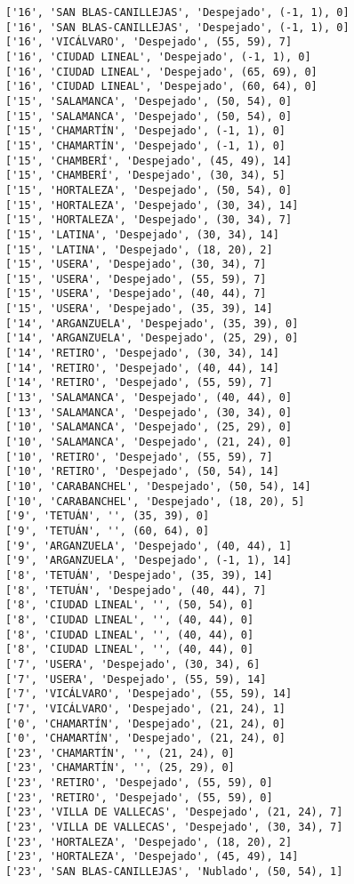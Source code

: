 \documentclass[11pt]{article}
\begin{document}
\begin{Verbatim}[commandchars=\\\{\}]
['16', 'SAN BLAS-CANILLEJAS', 'Despejado', (-1, 1), 0]
['16', 'SAN BLAS-CANILLEJAS', 'Despejado', (-1, 1), 0]
['16', 'VICÁLVARO', 'Despejado', (55, 59), 7]
['16', 'CIUDAD LINEAL', 'Despejado', (-1, 1), 0]
['16', 'CIUDAD LINEAL', 'Despejado', (65, 69), 0]
['16', 'CIUDAD LINEAL', 'Despejado', (60, 64), 0]
['15', 'SALAMANCA', 'Despejado', (50, 54), 0]
['15', 'SALAMANCA', 'Despejado', (50, 54), 0]
['15', 'CHAMARTÍN', 'Despejado', (-1, 1), 0]
['15', 'CHAMARTÍN', 'Despejado', (-1, 1), 0]
['15', 'CHAMBERÍ', 'Despejado', (45, 49), 14]
['15', 'CHAMBERÍ', 'Despejado', (30, 34), 5]
['15', 'HORTALEZA', 'Despejado', (50, 54), 0]
['15', 'HORTALEZA', 'Despejado', (30, 34), 14]
['15', 'HORTALEZA', 'Despejado', (30, 34), 7]
['15', 'LATINA', 'Despejado', (30, 34), 14]
['15', 'LATINA', 'Despejado', (18, 20), 2]
['15', 'USERA', 'Despejado', (30, 34), 7]
['15', 'USERA', 'Despejado', (55, 59), 7]
['15', 'USERA', 'Despejado', (40, 44), 7]
['15', 'USERA', 'Despejado', (35, 39), 14]
['14', 'ARGANZUELA', 'Despejado', (35, 39), 0]
['14', 'ARGANZUELA', 'Despejado', (25, 29), 0]
['14', 'RETIRO', 'Despejado', (30, 34), 14]
['14', 'RETIRO', 'Despejado', (40, 44), 14]
['14', 'RETIRO', 'Despejado', (55, 59), 7]
['13', 'SALAMANCA', 'Despejado', (40, 44), 0]
['13', 'SALAMANCA', 'Despejado', (30, 34), 0]
['10', 'SALAMANCA', 'Despejado', (25, 29), 0]
['10', 'SALAMANCA', 'Despejado', (21, 24), 0]
['10', 'RETIRO', 'Despejado', (55, 59), 7]
['10', 'RETIRO', 'Despejado', (50, 54), 14]
['10', 'CARABANCHEL', 'Despejado', (50, 54), 14]
['10', 'CARABANCHEL', 'Despejado', (18, 20), 5]
['9', 'TETUÁN', '', (35, 39), 0]
['9', 'TETUÁN', '', (60, 64), 0]
['9', 'ARGANZUELA', 'Despejado', (40, 44), 1]
['9', 'ARGANZUELA', 'Despejado', (-1, 1), 14]
['8', 'TETUÁN', 'Despejado', (35, 39), 14]
['8', 'TETUÁN', 'Despejado', (40, 44), 7]
['8', 'CIUDAD LINEAL', '', (50, 54), 0]
['8', 'CIUDAD LINEAL', '', (40, 44), 0]
['8', 'CIUDAD LINEAL', '', (40, 44), 0]
['8', 'CIUDAD LINEAL', '', (40, 44), 0]
['7', 'USERA', 'Despejado', (30, 34), 6]
['7', 'USERA', 'Despejado', (55, 59), 14]
['7', 'VICÁLVARO', 'Despejado', (55, 59), 14]
['7', 'VICÁLVARO', 'Despejado', (21, 24), 1]
['0', 'CHAMARTÍN', 'Despejado', (21, 24), 0]
['0', 'CHAMARTÍN', 'Despejado', (21, 24), 0]
['23', 'CHAMARTÍN', '', (21, 24), 0]
['23', 'CHAMARTÍN', '', (25, 29), 0]
['23', 'RETIRO', 'Despejado', (55, 59), 0]
['23', 'RETIRO', 'Despejado', (55, 59), 0]
['23', 'VILLA DE VALLECAS', 'Despejado', (21, 24), 7]
['23', 'VILLA DE VALLECAS', 'Despejado', (30, 34), 7]
['23', 'HORTALEZA', 'Despejado', (18, 20), 2]
['23', 'HORTALEZA', 'Despejado', (45, 49), 14]
['23', 'SAN BLAS-CANILLEJAS', 'Nublado', (50, 54), 1]

\end{Verbatim}
\end{document}
